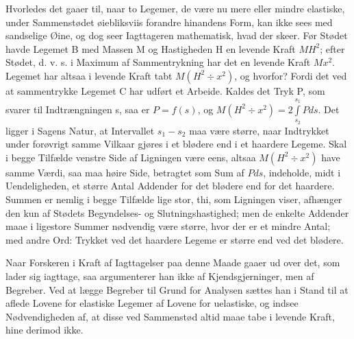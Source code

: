 \documentclass[12pt,a4paper]{book}
\begin{document}
Hvorledes det gaaer til, naar to Legemer, de være nu mere eller mindre
elastiske, under Sammenstødet øiebliksviis forandre hinandens Form, kan
ikke sees med sandselige Øine, og dog seer Iagttageren mathematisk, hvad
der skeer. Før Stødet havde Legemet B med Massen M og Hastigheden H en
levende Kraft $MH^2$; efter Stødet, d. v. s. i Maximum af
Sammentrykning har det en levende Kraft $Mx^2$. Legemet har altsaa i
levende Kraft tabt $M (H^2 \div x^2)$, og hvorfor? Fordi det ved at
sammentrykke Legemet C har udført et Arbeide. Kaldes det Tryk P, som
svarer til Indtrængningen s, saa er $P = f(s)$, og
$M (H^2 \div x^2) = 2 \int\limits_{s_2}^{s_1} Pds$. Det ligger i Sagens
Natur, at Intervallet $s_1 - s_2$ maa være større, naar Indtrykket under
forøvrigt samme Vilkaar gjøres i et blødere end i et haardere Legeme.
Skal i begge Tilfælde venstre Side af Ligningen være eens, altsaa
$M (H^2 \div x^2)$ have samme Værdi, saa maa høire Side, betragtet som
Sum af $Pds$, indeholde, midt i Uendeligheden, et større
{\small Antal Addender for det blødere end for det haardere. Summen er
nemlig i begge Tilfælde lige stor, thi, som Ligningen viser, afhænger
den kun af Stødets Begyndelses- og Slutningshastighed; men de enkelte
Addender maae i ligestore Summer nødvendig være større, hvor der er et
mindre Antal; med andre Ord: Trykket ved det haardere Legeme er større
end ved det blødere.}

Naar Forskeren i Kraft af Iagttagelser paa denne Maade gaaer ud over
det, som lader sig iagttage, saa argumenterer han ikke af
Kjendsgjerninger, men af Begreber. Ved at lægge Begreber til Grund for
Analysen sættes han i Stand til at aflede Lovene for elastiske Legemer
af Lovene for uelastiske, og indsee Nødvendigheden af, at disse ved
Sammenstød altid maae tabe i levende Kraft, hine derimod ikke.
\end{document}
